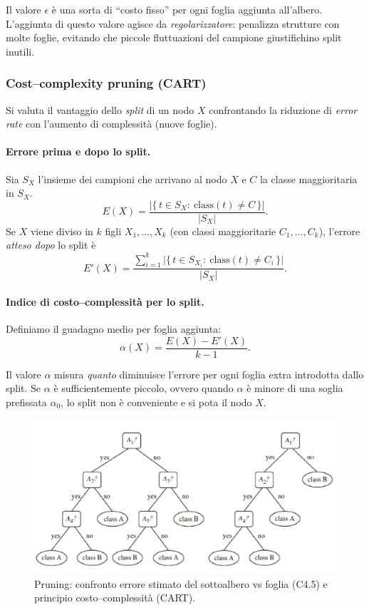 Il valore $\epsilon$ è una sorta di “costo fisso” per ogni foglia aggiunta all’albero. L’aggiunta di questo valore agisce da \emph{regolarizzatore}: penalizza strutture con molte foglie, evitando che piccole fluttuazioni del campione giustifichino split inutili.

\subsubsection*{Cost–complexity pruning (CART)}
Si valuta il vantaggio dello \emph{split} di un nodo \(X\) confrontando la riduzione di \emph{error rate} con l’aumento di complessità (nuove foglie).

\paragraph{Errore prima e dopo lo split.}
Sia \(S_X\) l’insieme dei campioni che arrivano al nodo \(X\) e \(C\) la classe maggioritaria in \(S_X\).
\[
E(X)=\frac{\bigl|\{\,t\in S_X:\ \mathrm{class}(t)\neq C\,\}\bigr|}{|S_X|}.
\]
Se \(X\) viene diviso in \(k\) figli \(X_1,\dots,X_k\) (con classi maggioritarie \(C_1,\dots,C_k\)), l’errore \emph{atteso dopo} lo split è
\[
E'(X)=\frac{\sum_{i=1}^{k}\bigl|\{\,t\in S_{X_i}:\ \mathrm{class}(t)\neq C_i\,\}\bigr|}{|S_X|}.
\]

\paragraph{Indice di costo–complessità per lo split.}
Definiamo il guadagno medio per foglia aggiunta:
\[
\alpha(X)=\frac{E(X)-E'(X)}{k-1}.
\]

Il valore \(\alpha\) misura \emph{quanto} diminuisce l’errore per ogni foglia extra introdotta dallo split. Se \(\alpha\) è sufficientemente piccolo, ovvero quando $\alpha$ è minore di una soglia prefissata \(\alpha_0\), lo split non è conveniente e si pota il nodo \(X\).

\begin{figure}[htbp]
  \centering
  \includegraphics[width=.75\textwidth]{images/tree_pruning_example.png}
  \caption{Pruning: confronto errore stimato del sottoalbero vs foglia (C4.5) e principio costo–complessità (CART).}
  \label{fig:pruning}
\end{figure}

